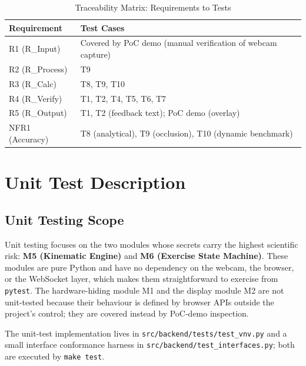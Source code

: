 \documentclass[12pt, titlepage]{article}
\begin{document}
\begin{table}[h!]
\centering
\begin{tabular}{|l|l|}
\hline
\textbf{Requirement} & \textbf{Test Cases} \\
\hline
R1 (R\_Input)   & Covered by PoC demo (manual verification of webcam capture) \\
R2 (R\_Process) & T9 \\
R3 (R\_Calc)    & T8, T9, T10 \\
R4 (R\_Verify)  & T1, T2, T4, T5, T6, T7 \\
R5 (R\_Output)  & T1, T2 (feedback text); PoC demo (overlay) \\
NFR1 (Accuracy) & T8 (analytical), T9 (occlusion), T10 (dynamic benchmark) \\
\hline
\end{tabular}
\caption{Traceability Matrix: Requirements to Tests}
\label{Table:vnv_trace}
\end{table}

\section{Unit Test Description}\label{sec:unit}

\subsection{Unit Testing Scope}
Unit testing focuses on the two modules whose secrets carry the
highest scientific risk: \textbf{M5 (Kinematic Engine)} and
\textbf{M6 (Exercise State Machine)}. These modules are pure Python
and have no dependency on the webcam, the browser, or the WebSocket
layer, which makes them straightforward to exercise from
\texttt{pytest}. The hardware-hiding module M1 and the display
module M2 are not unit-tested because their behaviour is defined by
browser APIs outside the project's control; they are covered instead
by PoC-demo inspection.

The unit-test implementation lives in
\texttt{src/backend/tests/test\_vnv.py} and a small interface
conformance harness in \texttt{src/backend/test\_interfaces.py}; both
are executed by \texttt{make test}.
\end{document}
